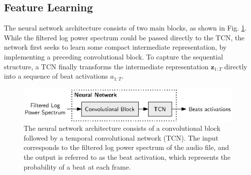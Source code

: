\documentclass{scrartcl}
\begin{document}
\subsection{Feature Learning}
The neural network architecture consists of two main blocks, as shown in Fig. \ref{fig:neural_net}. While the filtered log power spectrum could be passed directly to the TCN, the network first seeks to learn some compact intermediate representation, by implementing a preceding convolutional block. To capture the sequential structure, a TCN finally transforms the intermediate representation $\mathbf z_{1:T}$ directly into a sequence of beat activations $a_{1:T}$.
\begin{figure}[htbp]
\centering
\includegraphics[scale=1.0]{figures/neural_net.eps}
\caption{The neural network architecture consists of a convolutional block followed by a temporal convolutional network (TCN). The input corresponds to the filtered log power spectrum of the audio file, and the output is referred to as the beat activation, which represents the probability of a beat at each frame.}
\label{fig:neural_net}
\end{figure}    
\end{document}

